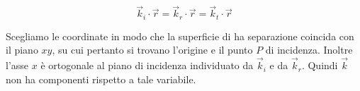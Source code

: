 \begin{equation}
	\vec{k}_i\cdot \vec{r} = \vec{k}_r\cdot \vec{r} = \vec{k}_t\cdot \vec{r}
	\label{eq:uguaglianzaVetOnda}
\end{equation}

Scegliamo le coordinate in modo che la superficie di ha separazione coincida con il piano $xy$, su cui pertanto si trovano l'origine e il punto $P$ di incidenza. Inoltre l'asse $x$ è ortogonale al piano di incidenza individuato da $\vec{k}_i$ e da $\vec{k}_r$. Quindi $\vec{k}$ non ha componenti rispetto a tale variabile.

\begin{figure}[htpb]
	\centering


	\begin{tikzpicture}[x=0.75pt,y=0.75pt,yscale=-1,xscale=1]


\end{tikzpicture}
\end{figure}
